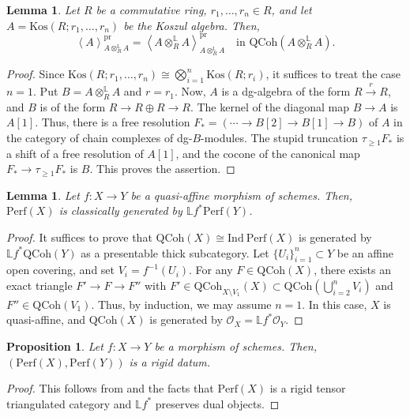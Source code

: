 \documentclass[11pt]{amsart}
\theoremstyle{definition}
\theoremstyle{plain}
\newtheorem{prop}[defn]{Proposition}
\newtheorem{lem}[defn]{Lemma}
\theoremstyle{remark}
\newcommand{\perf}{\mathrm{Perf}}
\newcommand{\qcoh}{\mathrm{QCoh}}
\newcommand{\Ind}{\mathrm{Ind}}
\newcommand{\mo}{\mathrm}
\newcommand{\os}{\overset}
\newcommand{\sO}{\mathscr{O}}
\newcommand{\ld}{\mathbb{L}}
\newcommand{\dotimes}{\otimes^{\mathbb{L}}}
\newcommand{\ang}[1]{{\left\langle{#1}\right\rangle}}
\numberwithin{equation}{section}
\begin{document}
\begin{lem}\label{lem:diagonal_of_Koszul_algebra}
Let \(R\) be a commutative ring, \(r_1,\ldots,r_n\in R\), and let 
\(A=\mo{Kos}(R;r_1,\ldots,r_n)\) be the Koszul algebra.
Then,
\[
\ang{A}_{A\dotimes_R A}^{\mo{pr}}
= \ang{A\dotimes_R A}_{A\dotimes_R A}^{\mo{pr}}
\quad \text{in } \qcoh(A\dotimes_R A).
\]
\end{lem}
\begin{proof}
Since \(\mo{Kos}(R; r_1,\ldots,r_n) \cong \bigotimes_{i=1}^n \mo{Kos}(R; r_i)\), it suffices to treat the case \(n=1\).
Put \(B=A\dotimes_R A\) and \(r=r_1\).  
Now, \(A\) is a dg-algebra of the form \(R\os{r}{\to} R\), and 
\(B\) is of the form \(R\to R\oplus R\to R\).  
The kernel of the diagonal map \(B\to A\) is \(A[1]\).  
Thus, there is a free resolution \(F_*=(\cdots \to B[2]\to B[1]\to B)\) of \(A\) in the category of chain complexes of dg-\(B\)-modules.  
The stupid truncation \(\tau_{\ge 1}F_*\) is a shift of a free resolution of \(A[1]\), and the cocone of the canonical map \(F_*\to \tau_{\ge 1}F_*\) is \(B\).  
This proves the assertion.
\end{proof}

\begin{lem}\label{lem:quasi_affine}
Let \(f:X\to Y\) be a quasi-affine morphism of schemes.  
Then, \(\perf(X)\) is classically generated by \(\ld f^*\perf(Y)\).
\end{lem}
\begin{proof}
It suffices to prove that \(\qcoh(X)\cong \Ind~\perf(X)\) is generated by \(\ld f^*\qcoh(Y)\) as a presentable thick subcategory.  
Let \(\{U_i\}_{i=1}^n\subset Y\) be an affine open covering, and set \(V_i=f^{-1}(U_i)\).  
For any \(F\in\qcoh(X)\), there exists an exact triangle 
\(F'\to F\to F''\) with 
\(F'\in \qcoh_{X\setminus V_1}(X)\subset \qcoh(\bigcup_{i=2}^n V_i)\) 
and \(F''\in \qcoh(V_1)\).  
Thus, by induction, we may assume \(n=1\).  
In this case, \(X\) is quasi-affine, and \(\qcoh(X)\) is generated by 
\(\sO_X=\ld f^*\sO_Y\).
\end{proof}

\begin{prop}\label{prop:schemes_are_rigid_datum}
Let \(f:X\to Y\) be a morphism of schemes.  
Then, \((\perf(X),\perf(Y))\) is a rigid datum.
\end{prop}
\begin{proof}
This follows from \cite[Theorem 6.3]{Ba} and the facts that 
\(\perf(X)\) is a rigid tensor triangulated category 
and \(\ld f^*\) preserves dual objects.
\end{proof}
\end{document}
